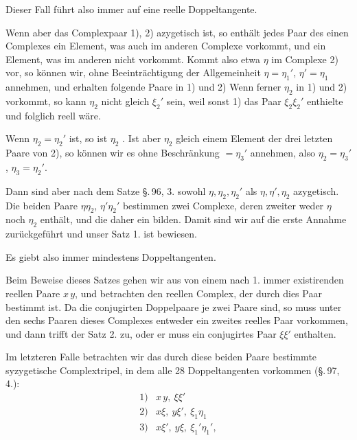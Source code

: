 Dieser Fall führt also immer auf eine reelle Doppeltangente.

Wenn aber  das Complexpaar 1), 2) azygetisch ist, so
enthält jedes Paar des einen Complexes ein Element, was auch im
anderen Complexe vorkommt, und ein Element, was im anderen nicht
vorkommt. Kommt also etwa $\eta$ im Complexe 2) vor, so können wir,
ohne Beeinträchtigung der Allgemeinheit $\eta = \eta_1'$, $\eta' = \eta_1$
annehmen, und erhalten folgende Paare in 1) und 2)
Wenn ferner $\eta_2$ in 1) und 2) vorkommt, so kann $\eta_2$ nicht gleich
$\xi_2'$ sein, weil sonst 1) das Paar $\xi_2\xi_2'$ enthielte und folglich
reell wäre.

Wenn $\eta_2 = \eta_2'$ ist, so ist $\eta_2$ . Ist aber $\eta_2$ gleich
einem Element der drei letzten Paare von 2), so können wir es ohne
Beschränkung $= \eta_3'$ annehmen, also $\eta_2 = \eta_3'$, $\eta_3 = \eta_2'$.

Dann sind aber nach dem Satze \S.\,96, 3. sowohl $\eta, \eta_2, \eta_2'$ als
$\eta, \eta', \eta_2$ azygetisch. Die beiden Paare $\eta\eta_2$, $\eta'\eta_2'$
bestimmen zwei Complexe, deren zweiter weder $\eta$ noch $\eta_2$ enthält,
und die daher ein  bilden. Damit sind wir auf
die erste Annahme zurückgeführt und unser Satz 1. ist bewiesen.

Es giebt also immer mindestens  Doppeltangenten.


Beim Beweise dieses Satzes gehen wir aus von einem nach 1. immer
existirenden reellen Paare $x\,y$, und betrachten den reellen Complex,
der durch dies Paar bestimmt ist. Da die conjugirten Doppelpaare je
zwei Paare sind, so muss unter den sechs Paaren dieses Complexes
entweder ein zweites reelles Paar vorkommen, und dann trifft der Satz
2. zu, oder er muss ein conjugirtes Paar $\xi\xi'$ enthalten.

Im letzteren Falle betrachten wir das durch diese beiden Paare
bestimmte syzygetische Complextripel, in dem alle 28 Doppeltangenten
vorkommen (\S.\,97, 4.):
\[
\begin{array}{rl}
1) & x\,y,\ \xi\xi' \\
2) & x\xi,\ y\xi',\ \xi_1\eta_1 \\
3) & x\xi',\ y\xi,\ \xi_1'\eta_1',
\end{array}
\]
